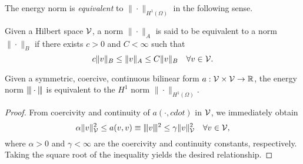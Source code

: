 The energy norm is \emph{equivalent} to $\| \cdot \|_{H^1(\Omega)}$ in the following sense.
\begin{definition}
  Given a Hilbert space $\mathcal{V}$, a norm $\| \cdot \|_A$ is said to be equivalent to a norm $\| \cdot \|_B$ if there exists $c > 0$ and $C < \infty$ such that
  \begin{equation*}
    c \| v \|_{B} \leq \| v \|_A \leq C \| v \|_{B} \quad \forall v \in \mathcal{V}.
  \end{equation*}
\end{definition}
\begin{lemma}
  Given a symmetric, coercive, continuous bilinear form $a:\mathcal{V} \times \mathcal{V} \to \mathbb{R}$, the energy norm $|\kern-1pt|\kern-1pt| \cdot |\kern-1pt|\kern-1pt|$ is equivalent to the $H^1$ norm $\| \cdot \|_{H^1(\Omega)}$.
  \begin{proof}
    From coercivity and continuity of $a(\cdot,cdot)$ in $\mathcal{V}$, we immediately obtain
    \begin{equation*}
      \alpha \| v \|_{\mathcal{V}}^2 \leq a(v,v) \equiv |\kern-1pt|\kern-1pt| v |\kern-1pt|\kern-1pt|^2 \leq \gamma \| v \|_{\mathcal{V}}^2 \quad \forall v \in \mathcal{V},
    \end{equation*}
    where $\alpha > 0$ and $\gamma < \infty$ are the coercivity and continuity constants, respectively. Taking the square root of the inequality yields the desired relationship.
  \end{proof}
\end{lemma}

